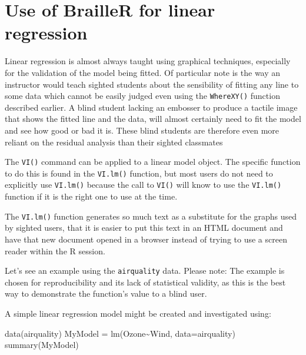 \documentclass[
]{book}
\newenvironment{Shaded}{\begin{snugshade}}{\end{snugshade}}
\newcommand{\AttributeTok}[1]{\textcolor[rgb]{0.77,0.63,0.00}{#1}}
\newcommand{\FunctionTok}[1]{\textcolor[rgb]{0.00,0.00,0.00}{#1}}
\newcommand{\NormalTok}[1]{#1}
\newcommand{\OtherTok}[1]{\textcolor[rgb]{0.56,0.35,0.01}{#1}}
\newcommand{\SpecialCharTok}[1]{\textcolor[rgb]{0.00,0.00,0.00}{#1}}
\begin{document}
\hypertarget{use-of-brailler-for-linear-regression}{%
\section{Use of BrailleR for linear regression}\label{use-of-brailler-for-linear-regression}}

Linear regression is almost always taught using graphical techniques, especially for the validation of the model being fitted. Of particular note is the way an instructor would teach sighted students about the sensibility of fitting any line to some data which cannot be easily judged even using the \texttt{WhereXY()} function described earlier. A blind student lacking an embosser to produce a tactile image that shows the fitted line and the data, will almost certainly need to fit the model and see how good or bad it is. These blind students are therefore even more reliant on the residual analysis than their sighted classmates

The \texttt{VI()} command can be applied to a linear model object. The specific function to do this is found in the \texttt{VI.lm()} function, but most users do not need to explicitly use \texttt{VI.lm()} because the call to \texttt{VI()} will know to use the \texttt{VI.lm()} function if it is the right one to use at the time.

The \texttt{VI.lm()} function generates so much text as a substitute for the graphs used by sighted users, that it is easier to put this text in an HTML document and have that new document opened in a browser instead of trying to use a screen reader within the R session.

Let's see an example using the \texttt{airquality} data.
Please note: The example is chosen for reproducibility and its lack of statistical validity, as this is the best way to demonstrate the function's value to a blind user.

A simple linear regression model might be created and investigated using:

\begin{Shaded}
\begin{Highlighting}[]
\FunctionTok{data}\NormalTok{(airquality)}
\NormalTok{MyModel }\OtherTok{=} \FunctionTok{lm}\NormalTok{(Ozone}\SpecialCharTok{\textasciitilde{}}\NormalTok{Wind, }\AttributeTok{data=}\NormalTok{airquality)}
\FunctionTok{summary}\NormalTok{(MyModel)}
\end{Highlighting}
\end{Shaded}
\end{document}
